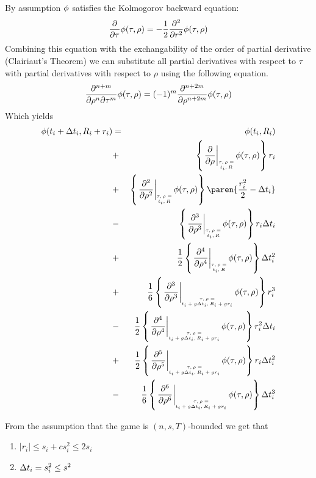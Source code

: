 \documentclass{article}[12pt]
\begin{document}
By assumption $\phi$ satisfies the Kolmogorov backward equation:
\begin{equation*} 
  \frac{\partial}{\partial \tau} \phi(\tau,\rho)
  = -\frac{1}{2} \frac{\partial^2}{\partial r^2} \phi(\tau,\rho)
\end{equation*}
Combining this equation with the exchangability of the order of
partial derivative (Clairiaut's Theorem) we can substitute all
partial derivatives with respect to $\tau$ with partial derivatives
with respect to $\rho$ using the following equation.
\[
  \frac{\partial^{n+m}}{\partial \rho^n \partial \tau^m} \phi(\tau,\rho)=
  (-1)^m \frac{\partial^{n+2m}}{\partial \rho^{n+2m}} \phi(\tau,\rho)
\]
Which yields
\begin{eqnarray}
      \pot(t_i+\deltat_i,\R_i+r_i) & =&  
    \pot(t_i,\R_i)\\
    &+& \at{\frac{\partial}{\partial \rho}} r_i \label{term:coll1}\\
    &+& \at{\frac{\partial^2}{\partial \rho^2}} \paren{\frac{r_i^2}{2}-\deltat_i} \label{term:coll2}\\
    &-& \at{\frac{\partial^3}{\partial \rho^3}} r_i \deltat_i \label{term:coll3}\\
    &+& \frac{1}{2} \at{\frac{\partial^4}{\partial \rho^4}} \deltat_i^2 \label{term:coll4}\\
    &+& \frac{1}{6} \att{\frac{\partial^3}{\partial \rho^3}} r_i^3 \label{term:coll5}\\
    &-& \frac{1}{2} \att{\frac{\partial^4}{\partial \rho^4}} r_i^2\deltat_i \label{term:coll6}\\
    &+& \frac{1}{2} \att{\frac{\partial^5}{\partial \rho^5}} r_i\deltat_i^2 \label{term:coll7}\\
    &-& \frac{1}{6} \att{\frac{\partial^6}{\partial \rho^6}} \deltat_i^3 \label{term:coll8}
\end{eqnarray}

  From the assumption that the game is $(n,s,T)$-bounded we get that 
  \begin{enumerate}
  \item $|r_i| \leq s_i +c s_i^2 \leq 2 s_i$
  \item $\Delta t_i = s_i^2 \leq s^2$
  \end{enumerate}
\end{document}
